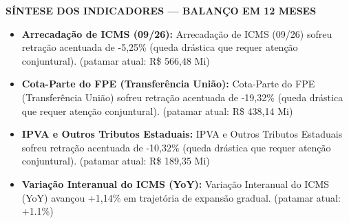 \documentclass[10pt,a4paper]{article}
\begin{document}
{\hfill%
%
}

\vspace{0.03cm}
\par\vspace{0.05cm}
\par\vspace{4pt}
{\fontsize{7.8}{9.4}\selectfont\bfseries\color{corprimaria}\MakeUppercase{Síntese dos Indicadores — Balanço em 12 Meses}}\par\vspace{2pt}
{\scriptsize\color{cinzatexto}
\begin{itemize}[leftmargin=10pt, itemsep=1.2pt, topsep=1pt, parsep=0pt]
   \item \textbf{\color{corprimaria}Arrecadação de ICMS (09/26):} Arrecadação de ICMS (09/26) sofreu retração acentuada de -5,25\% (queda drástica que requer atenção conjuntural). (patamar atual: R\$ 566,48 Mi)
   \item \textbf{\color{corprimaria}Cota-Parte do FPE (Transferência União):} Cota-Parte do FPE (Transferência União) sofreu retração acentuada de -19,32\% (queda drástica que requer atenção conjuntural). (patamar atual: R\$ 438,14 Mi)
   \item \textbf{\color{corprimaria}IPVA e Outros Tributos Estaduais:} IPVA e Outros Tributos Estaduais sofreu retração acentuada de -10,32\% (queda drástica que requer atenção conjuntural). (patamar atual: R\$ 189,35 Mi)
   \item \textbf{\color{corprimaria}Variação Interanual do ICMS (YoY):} Variação Interanual do ICMS (YoY) avançou +1,14\% em trajetória de expansão gradual. (patamar atual: +1.1\%)
\end{itemize}
}
\par\vspace{0.05cm}
\end{document}
